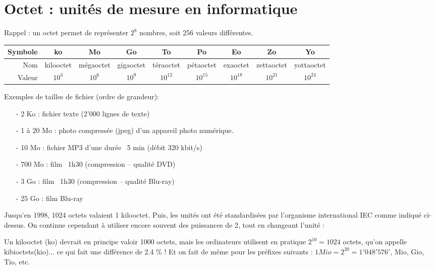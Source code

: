 \documentclass[11pt, a4paper]{book}
\begin{document}
\section{Octet : unités de mesure en informatique}
Rappel : un octet permet de représenter $2^8$ nombres, soit 256 valeurs différentes.
\begin{center}
   \begin{tabular}{| r || c |  c | c | c | c | c | c |  c |}
     \hline
     Symbole & ko & Mo & Go & To & Po & Eo & Zo & Yo \\ \hline
     Nom & kilooctet & mégaoctet & gigaoctet & téraoctet & pétaoctet & exaoctet & zettaoctet & yottaoctet   \\ \hline
     Valeur & $10^{3}$ & $10^{6}$ & $10^{9}$ & $10^{12}$ & $10^{15}$ & $10^{18}$ & $10^{21}$ & $10^{24}$  \\ \hline
   \end{tabular}
\end{center}

Exemples de tailles de fichier (ordre de grandeur):
\begin{enumerate}
    \item[-] 2 Ko :        fichier texte (2’000 lignes de texte)
    \item[-] 1 à 20 Mo :    photo compressée (jpeg) d’un appareil photo numérique.
    \item[-] 10 Mo :     fichier MP3 d’une durée ~5 min (débit 320 kbit/s)
    \item[-] 700 Mo :     film ~1h30 (compression – qualité DVD)
    \item[-] 3 Go :         film ~1h30 (compression – qualité Blu-ray)
    \item[-] 25 Go :     film Blu-ray
\end{enumerate}

\begin{remarque}
Jusqu'en 1998, 1024 octets valaient 1 kilooctet. Puis, les unités ont été standardisées par l'organisme international IEC comme indiqué ci-dessus. On continue cependant à utiliser encore souvent des puissances de 2, tout en changeant l'unité :

Un kilooctet (ko) devrait en principe valoir 1000 octets, mais les ordinateurs utilisent en pratique $2^{10}=1024$ octets, qu'on appelle kibioctets(kio)... ce qui fait une différence de 2.4 \% ! Et on fait de même pour les préfixes suivants : $1 Mio = 2^{20}=1'048'576'$, Mio, Gio, Tio, etc.
\end{remarque}
\end{document}
